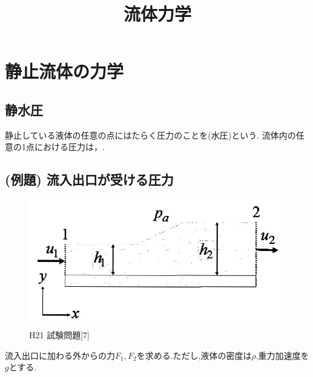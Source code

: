 \documentclass[a4paper]{jsarticle}
\author{}
\title{流体力学}
\date{}
\begin{document}
\maketitle

\section{静止流体の力学}
\subsection{静水圧}
静止している液体の任意の点にはたらく圧力のことを(水圧)という.
流体内の任意の1点における圧力は，.
\subsection{(例題) 流入出口が受ける圧力}
\begin{figure}[htbp]
    \begin{center}
        \includegraphics[width=120mm]{images/ryuriki_image4.jpg}
        \caption{H21 試験問題[7]}
    \end{center}
\end{figure}
流入出口に加わる外からの力$F_1,F_2$を求める.ただし,液体の密度は$\rho$,重力加速度を$g$とする.
\end{document}
